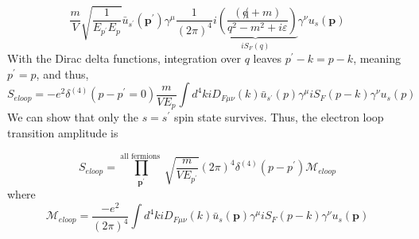 $$
\frac{m}{V} \sqrt{\frac{1}{E_{p^{\prime}} E_{p}}} \bar{u}_{s^{\prime}}\left(\mathbf{p}^{\prime}\right) \gamma^{\mu} \frac{1}{(2 \pi)^{4}} \underbrace{i\left(\frac{(\not q+m)}{q^{2}-m^{2}+i \varepsilon}\right)}_{i S_{F}(q)} \gamma^{\nu} u_{s}(\mathbf{p})
$$
With the Dirac delta functions, integration over $q$ leaves $p^{\prime}-k=p-k$, meaning $p^{\prime}=p$, and thus,
$$
S_{e l o o p}=-e^{2} \delta^{(4)}\left(p-p^{\prime}=0\right) \frac{m}{V E_{p}} \int d^{4} k i D_{F \mu \nu}(k) \bar{u}_{s^{\prime}}(p) \gamma^{\mu} i S_{F}(p-k) \gamma^{\nu} u_{s}(p)
$$
We can show that only the $s=s^{\prime}$ spin state survives. Thus, the electron loop transition amplitude is
\begin{qt}
    \begin{equation}
S_{e l o o p}=\prod_{\mathbf{p}^{\prime}}^{\text {all fermions }} \sqrt{\frac{m}{V E_{p^{\prime}}}}(2 \pi)^{4} \delta^{(4)}\left(p-p^{\prime}\right) \mathcal{M}_{e l o o p}
\end{equation}
where
\begin{equation}
\mathcal{M}_{e l o o p}=\frac{-e^{2}}{(2 \pi)^{4}} \int d^{4} k i D_{F \mu \nu}(k) \bar{u}_{s}(\mathbf{p}) \gamma^{\mu} i S_{F}(p-k) \gamma^{\nu} u_{s}(\mathbf{p})
\end{equation}
\end{qt}

